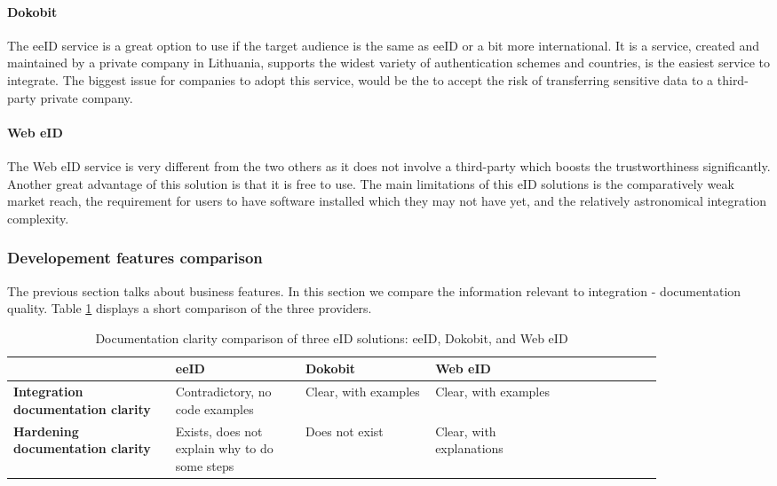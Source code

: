\paragraph{Dokobit}

The eeID service is a great option to use if the target audience is the same as eeID or a bit more international. It is a service, created and maintained by a private company in Lithuania, supports the widest variety of authentication schemes and countries, is the easiest service to integrate. The biggest issue for companies to adopt this service, would be the to accept the risk of transferring sensitive data to a third-party private company.

\paragraph{Web eID}

The Web eID service is very different from the two others as it does not involve a third-party which boosts the trustworthiness significantly. Another great advantage of this solution is that it is free to use. The main limitations of this eID solutions is the comparatively weak market reach, the requirement for users to have software installed which they may not have yet, and the relatively astronomical integration complexity.

\subsubsection{Developement features comparison}

The previous section talks about business features. In this section we compare the information relevant to integration - documentation quality. Table \ref{tbl:summary-comparison-docs} displays a short comparison of the three providers.

\begin{table}
    \centering
    \begin{tabular}{ >{\raggedright}p{0.25\linewidth} | >{\raggedright}p{0.2\linewidth} | >{\raggedright}p{0.2\linewidth} | >{\raggedright}p{0.2\linewidth} p{0px}}
                                                   & \textbf{eeID}                                 & \textbf{Dokobit}     & \textbf{Web eID}         & \\
        \hline
        \textbf{Integration documentation clarity} & Contradictory, no code examples               & Clear, with examples & Clear, with examples     & \\
        \hline
        \textbf{Hardening documentation clarity}   & Exists, does not explain why to do some steps & Does not exist       & Clear, with explanations & \\
    \end{tabular}
    \caption{Documentation clarity comparison of three eID solutions: eeID, Dokobit, and Web eID}
    \label{tbl:summary-comparison-docs}
\end{table}

